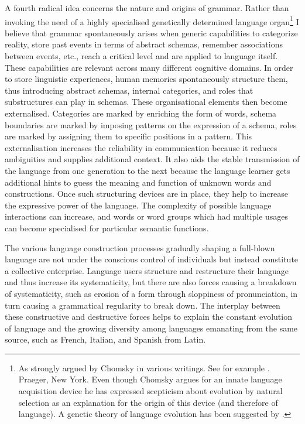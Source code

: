 A fourth radical idea concerns the nature and origins of 
grammar. Rather than invoking the need of a highly 
specialised genetically determined language 
organ\footnote{
As strongly argued by Chomsky in various writings. 
See for example \cite{Chomsky:1968}. 
Praeger, New York. Even though Chomsky argues for 
an innate language acquisition device he has expressed
scepticism about evolution by natural selection
as an explanation for the 
origin of this device (and therefore of language). 
A genetic theory of language evolution 
has been suggested by \cite{Pinker:1994}.}
I believe that grammar spontaneously arises when 
generic capabilities to categorize reality, store past
events in terms of abstract schemas, remember associations
between events, etc., reach a critical level and are
applied to language itself. These capabilities are 
relevant across many different cognitive domains. 
In order to store linguistic
experiences, human memories spontaneously structure them, thus 
introducing abstract schemas, internal categories, and 
roles that substructures can play in schemas.
These organisational elements then become externalised. 
Categories are marked by enriching
the form of words, schema boundaries are marked by 
imposing patterns on the expression of a schema, 
roles are marked by assigning
them to specific positions in a 
pattern. This externalisation 
increases the reliability in communication because
it reduces ambiguities and supplies additional context. It 
also aids the stable transmission of the language from one
generation to the next because the language learner
gets additional hints to guess the meaning and function of unknown
words and constructions. 
Once such structuring devices are in place, they help 
to increase the expressive power of the language. The 
complexity of possible language interactions can increase, 
and words or word groups which had multiple usages
can become specialised for particular semantic functions. 

The various language construction processes gradually 
shaping a full-blown language 
are not under the conscious control of individuals but
instead constitute a collective enterprise. Language users 
structure and restructure their language and thus increase its
systematicity, but there are also forces causing a breakdown 
of systematicity, such as erosion of a form 
through sloppiness of pronunciation, in turn causing a grammatical 
regularity to break down. The interplay between 
these constructive and destructive forces helps to explain
the constant evolution of language and the growing 
diversity among languages emanating from the same source, such as
French, Italian, and Spanish from Latin. 

